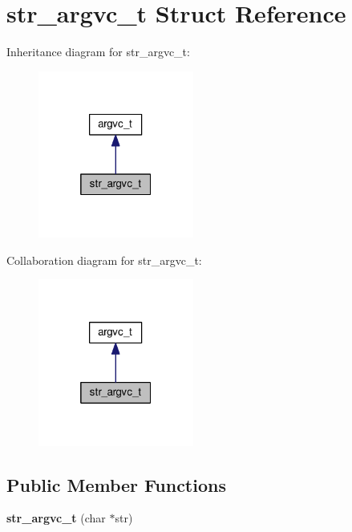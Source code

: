\hypertarget{structstr__argvc__t}{}\section{str\+\_\+argvc\+\_\+t Struct Reference}
\label{structstr__argvc__t}


Inheritance diagram for str\+\_\+argvc\+\_\+t\+:
\nopagebreak
\begin{figure}[H]
\begin{center}
\leavevmode
\includegraphics[width=145pt]{structstr__argvc__t__inherit__graph}
\end{center}
\end{figure}


Collaboration diagram for str\+\_\+argvc\+\_\+t\+:
\nopagebreak
\begin{figure}[H]
\begin{center}
\leavevmode
\includegraphics[width=145pt]{structstr__argvc__t__coll__graph}
\end{center}
\end{figure}
\subsection*{Public Member Functions}
\begin{DoxyCompactItemize}
\item 
{\bfseries str\+\_\+argvc\+\_\+t} (char $\ast$str)\hypertarget{structstr__argvc__t_a4ac94b1fb77ca02dfb4175d9f41f1bb6}{}\label{structstr__argvc__t_a4ac94b1fb77ca02dfb4175d9f41f1bb6}

\end{DoxyCompactItemize}
